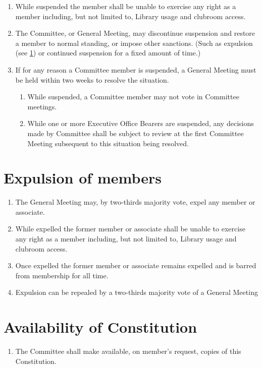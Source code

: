 \documentclass[a4paper]{article}
\begin{document}
\begin{enumerate}
    \item While suspended the member shall be unable to exercise any right as a member including, but not limited to, Library usage and clubroom access.
    \item The Committee, or General Meeting, may discontinue suspension and restore a member to normal standing, or impose other sanctions. (Such as expulsion (see \cref{sec:expulsion}) or continued suspension for a fixed amount of time.)
    \item  If for any reason a Committee member is suspended, a General Meeting must be held within two weeks to resolve the situation.
          \begin{enumerate}
              \item While suspended, a Committee member may not vote in Committee meetings.
              \item While one or more Executive Office Bearers are suspended, any decisions made by Committee shall be subject to review at the first Committee Meeting subsequent to this situation being resolved.
          \end{enumerate}
\end{enumerate}


\section{Expulsion of members} \label{sec:expulsion}
\begin{enumerate}
    \item The General Meeting may, by two-thirds majority vote, expel any member or associate.
    \item While expelled the former member or associate shall be unable to exercise any right as a member including, but not limited to, Library usage and clubroom access.
    \item \label{item:expulsion_no_membership} Once expelled the former member or associate remains expelled and is barred from membership for all time.
    \item Expulsion can be repealed by a two-thirds majority vote of a General Meeting
\end{enumerate}


\section{Availability of Constitution} \label{sec:availability}
\begin{enumerate}
    \item The Committee shall make available, on member's request, copies of this Constitution.
\end{enumerate}
\end{document}
